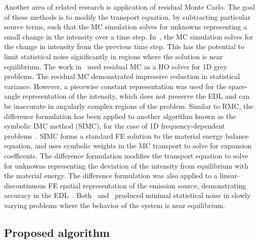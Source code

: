 \documentclass[11pt]{article}
\begin{document}
Another area of related research is application of
residual Monte Carlo.  The goal of these methods is to modify the transport equation, by subtracting
particular source terms, such that the MC simulation solves for unknowns representing
a small change in the intensity over a time step.  In~\cite{rmc}, the MC simulation
solves for the change in intensity from the previous time step. This has the potential to limit statistical noise
significantly in regions where the solution is near equilibrium.
The work in~\cite{rmc} used residual MC as a HO solver for 1D grey problems. The
  residual MC demonstrated impressive reduction in statistical variance.
  However, a piecewise constant representation was used for the
space-angle representation of the intensity, which
does not preserve the EDL and can be inaccurate in angularly complex regions of the
problem.  Similar to RMC, the difference formulation has been applied to another algorithm known as the symbolic IMC method
(SIMC), for the case of 1D frequency-dependent problems~\cite{simc_const}.  SIMC forms a
standard FE solution to the material energy balance equation, and uses symbolic
weights in the MC transport to solve for expansion coefficents.  The difference
formulation modifies the transport equation to solve for unknowns representing the
deviation of the intensity from
equilibrium with the material energy.  The difference
formulation was also applied to a linear-discontinuous FE spatial
representation of the emission source, demonstrating accuracy in the EDL~\cite{simc}. 
Both~\cite{simc_const} and~\cite{rmc} produced minimal
statistical noise in slowly varying problems where the behavior of the system is near
equilibrium. 

\subsection{Proposed algorithm}
\end{document}
